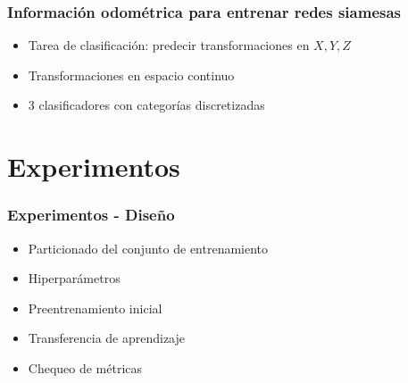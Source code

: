 \documentclass{beamer}
\begin{document}
\begin{frame}
\frametitle{Información odométrica para entrenar redes siamesas}
\begin{itemize}
    \item Tarea de clasificación: predecir transformaciones en \(X, Y, Z\)
    \item Transformaciones en espacio continuo 
    \item 3 clasificadores con categorías discretizadas
\end{itemize}
\end{frame}





\section{Experimentos}
\begin{frame}
\frametitle{Experimentos - Diseño}
\begin{itemize}
    \item Particionado del conjunto de entrenamiento
    \item Hiperparámetros
    \item Preentrenamiento inicial
    \item Transferencia de aprendizaje
    \item Chequeo de métricas
\end{itemize}
\end{frame}
\end{document}
